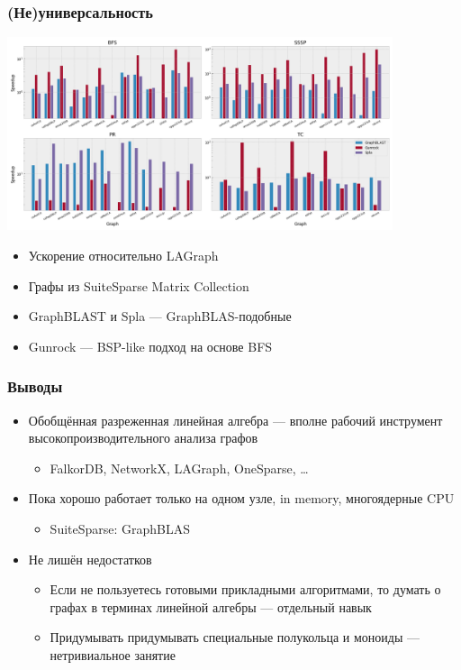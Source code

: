 \documentclass[xcolor=table,aspectratio=169]{beamer}
\begin{document}
\begin{frame}[fragile]
  \frametitle{(Не)универсальность}
  \begin{center}
    \includegraphics[width=0.85\textwidth]{pictures/rq1_rel.png}
  
  \scriptsize
  \begin{minipage}{0.49\textwidth}
  \begin{itemize}
  \item Ускорение относительно LAGraph 
  \item Графы из SuiteSparse Matrix Collection
  \end{itemize}
\end{minipage}
\begin{minipage}{0.49\textwidth}
  \begin{itemize}
  \item GraphBLAST и Spla --- GraphBLAS-подобные
  \item Gunrock --- BSP-like подход на основе BFS
  \end{itemize}
\end{minipage}
\end{center}  
\end{frame}

\begin{frame}[fragile]
  \frametitle{Выводы}
  \begin{itemize}
    \item Обобщённая разреженная линейная алгебра --- вполне рабочий инструмент высокопроизводительного анализа графов 
    \begin{itemize}
      \item FalkorDB, NetworkX, LAGraph, OneSparse, \ldots
    \end{itemize}
    \item Пока хорошо работает только на одном узле, in memory, многоядерные CPU
    \begin{itemize}
      \item SuiteSparse: GraphBLAS
    \end{itemize}
    \item Не лишён недостатков
    \begin{itemize}
      \item Если не пользуетесь готовыми прикладными алгоритмами, то думать о графах в терминах линейной алгебры --- отдельный навык
      \item Придумывать придумывать специальные полукольца и моноиды --- нетривиальное занятие
    \end{itemize}
  \end{itemize}
\end{frame}
\end{document}
